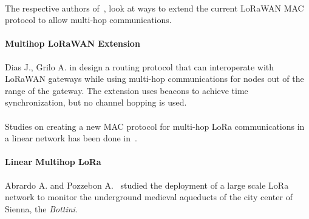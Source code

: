\paragraph{}

The respective authors of~\cite{DIAS2018424, 8856256}, look at ways to extend
the current LoRaWAN MAC protocol to allow multi-hop communications.

\paragraph{Multihop LoRaWAN Extension} Dias J., Grilo A. in \cite{DIAS2018424}
design a routing protocol that can interoperate with LoRaWAN gateways while
using multi-hop communications for nodes out of the range of the gateway.
The extension uses beacons to achieve time synchronization, but no channel
hopping is used.




\paragraph{}

Studies on creating a new MAC protocol for multi-hop LoRa communications in a linear
network has been done in~\cite{Abrardo_2019,duong2018}.

\paragraph{Linear Multihop LoRa}

Abrardo A. and Pozzebon A.~\cite{Abrardo_2019} studied the deployment of a
large scale LoRa network to monitor the underground medieval aqueducts of the city center
of Sienna, the \emph{Bottini}.

